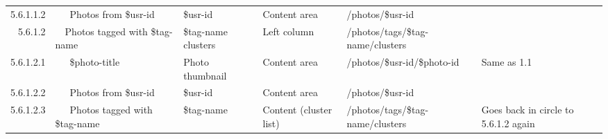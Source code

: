\documentclass[12pt,a4paper]{article}
\begin{document}
\begin{landscape}
\begin{table}[h!b!p!]
\begin{center}
\begin{tiny}
\begin{tabular}{r|l|l|l|l|p{3cm}}
                    5.6.1.1.2 &
                    ~~~Photos from \$usr-id &
                    \$usr-id &
                    Content area &
                    /photos/\$usr-id &
                    \\

                  5.6.1.2 &
                  ~~Photos tagged with \$tag-name &
                  \$tag-name clusters &
                  Left column &
                  /photos/tags/\$tag-name/clusters &
                  \\

                    5.6.1.2.1 &
                    ~~~\$photo-title &
                    Photo thumbnail &
                    Content area &
                    /photos/\$usr-id/\$photo-id &
                    Same as 1.1 \\

                    5.6.1.2.2 &
                    ~~~Photos from \$usr-id &
                    \$usr-id &
                    Content area &
                    /photos/\$usr-id &
                    \\

                    5.6.1.2.3 &
                    ~~~Photos tagged with \$tag-name &
                    \$tag-name &
                    Content (cluster list) &
                    /photos/tags/\$tag-name/clusters &
                    Goes back in circle to 5.6.1.2 again \\





          \end{tabular}
        \rm
      \end{tiny}
    \end{center}
  \end{table}
\end{landscape}
\end{document}

